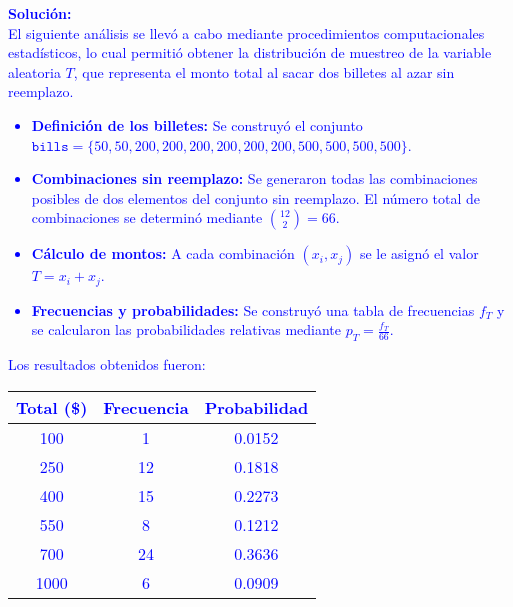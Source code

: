\documentclass[12pt]{article}
\begin{document}
\begin{enumerate}
	      \textcolor{blue}{
		      \begin{minipage}{\linewidth}
			      \textcolor{blue}{\textbf{Solución:}} \\
			      \textcolor{blue}{El siguiente análisis se llevó a cabo mediante procedimientos computacionales estadísticos, lo cual permitió obtener la distribución de muestreo de la variable aleatoria \(T\), que representa el monto total al sacar dos billetes al azar sin reemplazo.}
			      \begin{itemize}
				      \item \textbf{Definición de los billetes:} Se construyó el conjunto \( \texttt{bills} = \{50, 50, 200, 200, 200, 200, 200, 200, 500, 500, 500, 500\} \).
				      \item \textbf{Combinaciones sin reemplazo:} Se generaron todas las combinaciones posibles de dos elementos del conjunto sin reemplazo. El número total de combinaciones se determinó mediante \( \binom{12}{2} = 66 \).
				      \item \textbf{Cálculo de montos:} A cada combinación \( (x_i, x_j) \) se le asignó el valor \( T = x_i + x_j \).
				      \item \textbf{Frecuencias y probabilidades:} Se construyó una tabla de frecuencias \( f_T \) y se calcularon las probabilidades relativas mediante \( p_T = \frac{f_T}{66} \).
			      \end{itemize}
		      \end{minipage}
	      }

	      \textcolor{blue}{Los resultados obtenidos fueron:}

	      \begin{center}
		      \begin{tabular}{|c|c|c|}
			      \hline
			      \textcolor{blue}{\textbf{Total (\$)}} & \textcolor{blue}{\textbf{Frecuencia}} & \textcolor{blue}{\textbf{Probabilidad}} \\
			      \hline
			      \textcolor{blue}{100}                 & \textcolor{blue}{1}                   & \textcolor{blue}{0.0152}                \\
			      \textcolor{blue}{250}                 & \textcolor{blue}{12}                  & \textcolor{blue}{0.1818}                \\
			      \textcolor{blue}{400}                 & \textcolor{blue}{15}                  & \textcolor{blue}{0.2273}                \\
			      \textcolor{blue}{550}                 & \textcolor{blue}{8}                   & \textcolor{blue}{0.1212}                \\
			      \textcolor{blue}{700}                 & \textcolor{blue}{24}                  & \textcolor{blue}{0.3636}                \\
			      \textcolor{blue}{1000}                & \textcolor{blue}{6}                   & \textcolor{blue}{0.0909}                \\
			      \hline
		      \end{tabular}
	      \end{center}


\end{enumerate}
\end{document}
